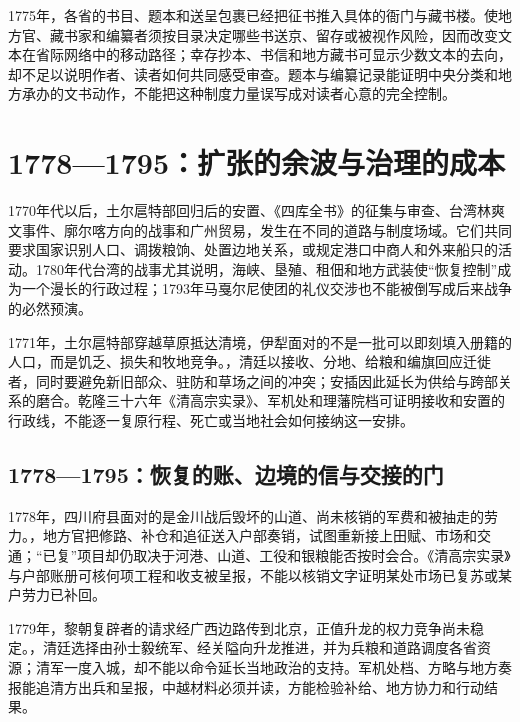 1775年，各省的书目、题本和送呈包裹已经把征书推入具体的衙门与藏书楼。使地方官、藏书家和编纂者须按目录决定哪些书送京、留存或被视作风险，因而改变文本在省际网络中的移动路径；幸存抄本、书信和地方藏书可显示少数文本的去向，却不足以说明作者、读者如何共同感受审查。题本与编纂记录能证明中央分类和地方承办的文书动作，不能把这种制度力量误写成对读者心意的完全控制。

\section{1778—1795：扩张的余波与治理的成本}

1770年代以后，土尔扈特部回归后的安置、《四库全书》的征集与审查、台湾林爽文事件、廓尔喀方向的战事和广州贸易，发生在不同的道路与制度场域。它们共同要求国家识别人口、调拨粮饷、处置边地关系，或规定港口中商人和外来船只的活动。1780年代台湾的战事尤其说明，海峡、垦殖、租佃和地方武装使“恢复控制”成为一个漫长的行政过程；1793年马戛尔尼使团的礼仪交涉也不能被倒写成后来战争的必然预演。

1771年，土尔扈特部穿越草原抵达清境，伊犁面对的不是一批可以即刻填入册籍的人口，而是饥乏、损失和牧地竞争。，清廷以接收、分地、给粮和编旗回应迁徙者，同时要避免新旧部众、驻防和草场之间的冲突；安插因此延长为供给与跨部关系的磨合。乾隆三十六年《清高宗实录》、军机处和理藩院档可证明接收和安置的行政线，不能逐一复原行程、死亡或当地社会如何接纳这一安排。

\subsection{1778—1795：恢复的账、边境的信与交接的门}

1778年，四川府县面对的是金川战后毁坏的山道、尚未核销的军费和被抽走的劳力。，地方官把修路、补仓和追征送入户部奏销，试图重新接上田赋、市场和交通；“已复”项目却仍取决于河港、山道、工役和银粮能否按时会合。《清高宗实录》与户部账册可核何项工程和收支被呈报，不能以核销文字证明某处市场已复苏或某户劳力已补回。

1779年，黎朝复辟者的请求经广西边路传到北京，正值升龙的权力竞争尚未稳定。，清廷选择由孙士毅统军、经关隘向升龙推进，并为兵粮和道路调度各省资源；清军一度入城，却不能以命令延长当地政治的支持。军机处档、方略与地方奏报能追清方出兵和呈报，中越材料必须并读，方能检验补给、地方协力和行动结果。

